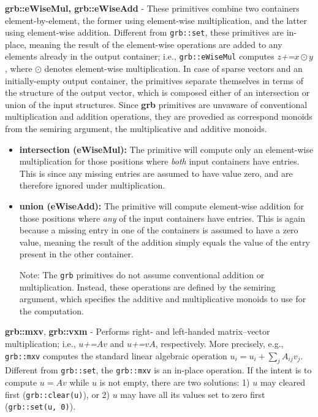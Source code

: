 	\textbf{grb::eWiseMul, grb::eWiseAdd} - These primitives combine two containers element-by-element, the former using element-wise multiplication, and the latter using element-wise addition. Different from \texttt{grb::set}, 
    these primitives are in-place, meaning the result of the element-wise operations are added to any elements already in the output container; i.e., \texttt{grb::eWiseMul} computes $z$\textit{+=}$x\odot y$, where $\odot$ denotes element-wise multiplication. 
    In case of sparse vectors and an initially-empty output container, the primitives separate themselves in terms of the structure of the output vector, which is composed either of an intersection or union of the input structures.
    Since \textbf{grb} primitives are unvaware of conventional multiplication and addition operations, they are provedied 
    as correspond monoids from the semiring argument, the multiplicative and additive monoids.
\begin{itemize}
  \item \textbf{intersection (eWiseMul):} The primitive will compute only an element-wise multiplication for those positions where \emph{both} input containers have entries. This is since any missing entries are assumed to have value zero, and are therefore ignored under multiplication.
  \item \textbf{union (eWiseAdd):} The primitive will compute element-wise addition for those positions where \emph{any} of the input containers have entries. This is again because a missing entry in one of the containers is assumed to have a zero value, meaning the result of the addition simply equals the value of the entry present in the other container.

      Note: The \texttt{grb} primitives do not assume conventional addition or multiplication. Instead, these operations are defined by the semiring argument, which specifies the additive and multiplicative monoids to use for the computation.

\end{itemize}

    \textbf{grb::mxv}, \textbf{grb::vxm} - Performs right- and left-handed matrix--vector multiplication; i.e., $u$\textit{+=}$Av$ and $u$\textit{+=}$vA$, respectively. More precisely, e.g., \texttt{grb::mxv} computes the standard linear algebraic operation $u_i = u_i + \sum_j A_{ij} v_j$. Different from \texttt{grb::set}, the \texttt{grb::mxv} is an in-place operation. If the intent is to compute $u=Av$ while $u$ is not empty, there are two solutions: 1) $u$ may cleared first (\texttt{grb::clear(u)}), or 2) $u$ may have all its values set to zero first (\texttt{grb::set(u, 0)}).\newline

